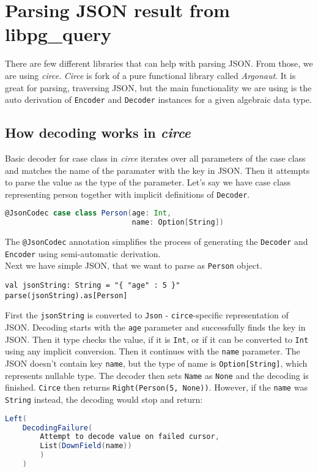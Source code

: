 \section{Parsing JSON result from libpg\_query}
There are few different libraries that can help with parsing JSON. From those, we are using \textit{circe}. \textit{Circe} is fork of a pure functional library called \textit{Argonaut}. It is great for parsing, traversing JSON, but the main functionality we are using is the auto derivation of \texttt{Encoder} and \texttt{Decoder} instances for a given algebraic data type. 

\subsection{How decoding works in \textit{circe}}
Basic decoder for case class in \textit{circe} iterates over all parameters of the case class and matches the name of the paramater with the key in JSON. Then it attempts to parse the value as the type of the parameter. Let's say we have case class representing person together with implicit definitions of \texttt{Decoder}.
\begin{lstlisting}[language=scala, basicstyle=\ttfamily, showstringspaces=false]
@JsonCodec case class Person(age: Int, 
                             name: Option[String])
\end{lstlisting}
The \texttt{@JsonCodec} annotation simplifies the process of generating the \texttt{Decoder} and \texttt{Encoder} using semi-automatic derivation. \cite{Semi automatic derivation} \\
Next we have simple JSON, that we want to parse as \texttt{Person} object.
\begin{lstlisting}[basicstyle=\ttfamily, showstringspaces=false]
val jsonString: String = "{ "age" : 5 }"
parse(jsonString).as[Person]
\end{lstlisting}
First the \texttt{jsonString} is converted to \texttt{Json} - \texttt{circe}-specific representation of JSON. Decoding starts with the \texttt{age} parameter and successfully finds the key in JSON. Then it type checks the value, if it is \texttt{Int}, or if it can be converted to \texttt{Int} using any implicit conversion. Then it continues with the \texttt{name} parameter. The JSON doesn't contain key \texttt{name}, but the type of name is \texttt{Option[String]}, which represents nullable type. The decoder then sets \texttt{Name} as \texttt{None} and the decoding is finished. \texttt{Circe} then returns \texttt{Right(Person(5, None))}.
\newpage
However, if the \texttt{name} was \texttt{String} instead, the decoding would stop and return: 
\begin{lstlisting}[language=scala, basicstyle=\ttfamily, showstringspaces=false]
Left(
    DecodingFailure(
        Attempt to decode value on failed cursor,
        List(DownField(name))
        )
    )
\end{lstlisting}

